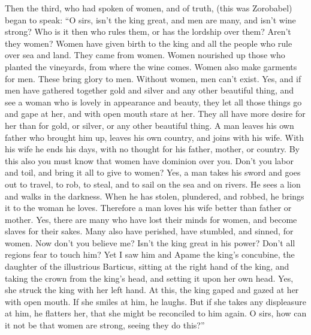  Then the third, who had spoken of women, and of truth,
(this was Zorobabel) began to speak:  ``O sirs, isn't the
king great, and men are many, and isn't wine strong? Who is it then who
rules them, or has the lordship over them? Aren't they women?
 Women have given birth to the king and all the people
who rule over sea and land.  They came from women. Women
nourished up those who planted the vineyards, from where the wine comes.
 Women also make garments for men. These bring glory to
men. Without women, men can't exist.  Yes, and if men
have gathered together gold and silver and any other beautiful thing,
and see a woman who is lovely in appearance and beauty, 
they let all those things go and gape at her, and with open mouth stare
at her. They all have more desire for her than for gold, or silver, or
any other beautiful thing.  A man leaves his own father
who brought him up, leaves his own country, and joins with his wife.
 With his wife he ends his days, with no thought for his
father, mother, or country.  By this also you must know
that women have dominion over you. Don't you labor and toil, and bring
it all to give to women?  Yes, a man takes his sword and
goes out to travel, to rob, to steal, and to sail on the sea and on
rivers.  He sees a lion and walks in the darkness. When
he has stolen, plundered, and robbed, he brings it to the woman he
loves.  Therefore a man loves his wife better than father
or mother.  Yes, there are many who have lost their minds
for women, and become slaves for their sakes.  Many also
have perished, have stumbled, and sinned, for women.  Now
don't you believe me? Isn't the king great in his power? Don't all
regions fear to touch him?  Yet I saw him and Apame the
king's concubine, the daughter of the illustrious Barticus, sitting at
the right hand of the king,  and taking the crown from
the king's head, and setting it upon her own head. Yes, she struck the
king with her left hand.  At this, the king gaped and
gazed at her with open mouth. If she smiles at him, he laughs. But if
she takes any displeasure at him, he flatters her, that she might be
reconciled to him again.  O sirs, how can it not be that
women are strong, seeing they do this?''

